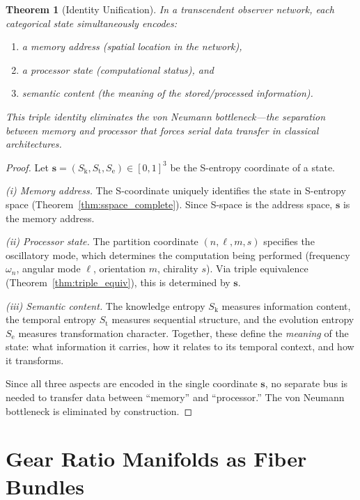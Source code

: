 \documentclass[11pt,twocolumn,a4paper]{article}
\newtheorem{theorem}{Theorem}[section]
\theoremstyle{definition}
\newcommand{\Sk}{S_{\mathrm{k}}}
\newcommand{\St}{S_{\mathrm{t}}}
\newcommand{\Se}{S_{\mathrm{e}}}
\begin{document}
\begin{theorem}[Identity Unification]\label{thm:identity}
In a transcendent observer network, each categorical state simultaneously encodes:
\begin{enumerate}[label=(\roman*)]
  \item a memory address (spatial location in the network),
  \item a processor state (computational status), and
  \item semantic content (the meaning of the stored/processed information).
\end{enumerate}
This triple identity eliminates the von Neumann bottleneck---the separation between
memory and processor that forces serial data transfer in classical architectures.
\end{theorem}

\begin{proof}
Let $\mathbf{s} = (\Sk, \St, \Se) \in [0,1]^3$ be the S-entropy coordinate of a state.

\emph{(i) Memory address.} The S-coordinate uniquely identifies the state in S-entropy
space (Theorem~\ref{thm:sspace_complete}). Since S-space is the address space, $\mathbf{s}$
is the memory address.

\emph{(ii) Processor state.} The partition coordinate $(n, \ell, m, s)$ specifies the
oscillatory mode, which determines the computation being performed (frequency $\omega_n$,
angular mode $\ell$, orientation $m$, chirality $s$). Via triple equivalence
(Theorem~\ref{thm:triple_equiv}), this is determined by $\mathbf{s}$.

\emph{(iii) Semantic content.} The knowledge entropy $\Sk$ measures information content,
the temporal entropy $\St$ measures sequential structure, and the evolution entropy $\Se$
measures transformation character. Together, these define the \emph{meaning} of the state:
what information it carries, how it relates to its temporal context, and how it transforms.

Since all three aspects are encoded in the single coordinate $\mathbf{s}$, no separate
bus is needed to transfer data between ``memory'' and ``processor.'' The von Neumann
bottleneck is eliminated by construction.
\end{proof}


\section{Gear Ratio Manifolds as Fiber Bundles}\label{sec:fiberbundle}
\end{document}
